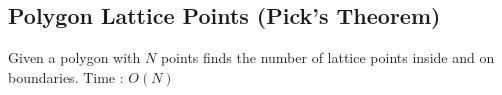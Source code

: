 \subsection{Polygon Lattice Points (Pick's Theorem)}

Given a polygon with $N$ points finds the number of lattice points inside and on boundaries.
Time : $O(N)$

